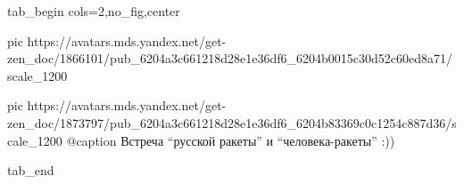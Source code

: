  
 
 
 
 


\ifcmt
  tab_begin cols=2,no_fig,center

		 pic https://avatars.mds.yandex.net/get-zen_doc/1866101/pub_6204a3c661218d28e1e36df6_6204b0015c30d52c60ed8a71/scale_1200

     pic https://avatars.mds.yandex.net/get-zen_doc/1873797/pub_6204a3c661218d28e1e36df6_6204b83369c0c1254c887d36/scale_1200
		 @caption Встреча \enquote{русской ракеты} и \enquote{человека-ракеты} :))

  tab_end
\fi
